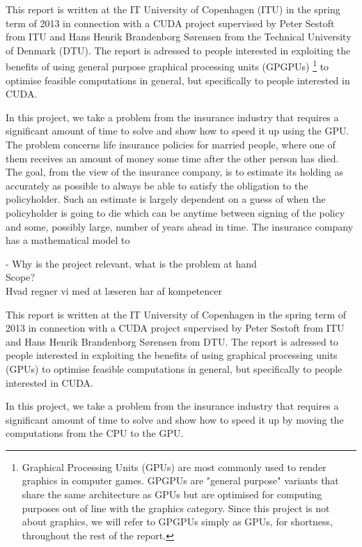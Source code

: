 This report is written at the IT University of Copenhagen (ITU) in the spring term of 2013 in connection with a CUDA project supervised by Peter Sestoft from ITU and Hans Henrik Brandenborg Sørensen from the Technical University of Denmark (DTU). The report is adressed to people interested in exploiting the benefits of using general purpose graphical processing units (GPGPUs) \footnote{Graphical Processing Units (GPUs) are most commonly used to render graphics in computer games. GPGPUs are "general purpose" variants that share the same architecture as GPUs but are optimised for computing purposes out of line with the graphics category. Since this project is not about graphics, we will refer to GPGPUs simply as GPUs, for shortness, throughout the rest of the report.} to optimise feasible computations in general, but specifically to people interested in CUDA.

In this project, we take a problem from the insurance industry that requires a significant amount of time to solve and show how to speed it up using the GPU. The problem concerns life insurance policies for married people, where one of them receives an amount of money some time after the other person has died. The goal, from the view of the insurance company, is to estimate its holding as accurately as possible to always be able to satisfy the obligation to the policyholder. Such an estimate is largely dependent on a guess of when the policyholder is going to die which can be anytime between signing of the policy and some, possibly large, number of years ahead in time. The insurance company has a mathematical model to 	







- Why is the project relevant, what is the problem at hand \\
	Scope? \cite{pmpp} \\
	Hvad regner vi med at læseren har af kompetencer

	This report is written at the IT University of Copenhagen in the spring term of 2013 in connection with a CUDA project supervised by Peter Sestoft from ITU and Hans Henrik Brandenborg Sørensen from DTU. The report is adressed to people interested in exploiting the benefits of using graphical processing units (GPUs) to optimise feasible computations in general, but specifically to people interested in CUDA.

	In this project, we take a problem from the insurance industry that requires a significant amount of time to solve and show how to speed it up by moving the computations from the CPU to the GPU.